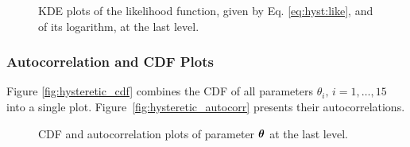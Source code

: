 \begin{figure}[hptb]
\centering
{}
\vspace{-8pt}
\caption{KDE plots of the likelihood function, given by Eq. \eqref{eq:hyst:like}, and of its logarithm, at the last level.}
\label{fig:hysteretic_kde_like}
\end{figure}


\subsubsection{Autocorrelation and CDF Plots}

Figure \ref{fig:hysteretic_cdf} combines the CDF of all parameters $\theta_i,\, i=1,\ldots,15$ into a single plot.
Figure~\ref{fig:hysteretic_autocorr} presents their autocorrelations.

\begin{figure}[hptb]
\centering
\hspace{-10pt}
\vspace{-8pt}
\caption{CDF and autocorrelation plots of parameter $\mbox{\boldmath$ \theta $}$ at the last level.}
\end{figure}

